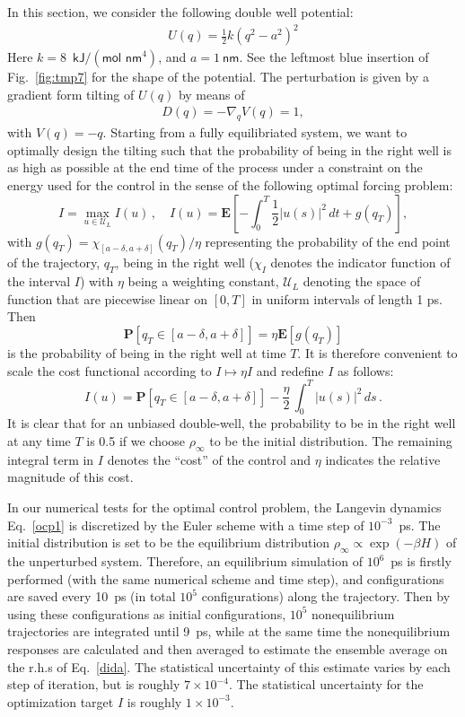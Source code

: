 \documentclass[]{tMPH2e}
\newcommand{\bE}{{\mathbf E}}
\newcommand{\bP}{{\mathbf P}}
\begin{document}
In this section, we consider the following double well potential:
\begin{align}
  U(q) = \frac12 k ( q^2 - a^2)^2
\end{align}
Here $k = 8$~$\textsf{kJ} / (\textsf{mol nm}^4)$, and $ a = 1\
\textsf{nm}$.  See the leftmost blue insertion of Fig.~\ref{fig:tmp7} for
the shape of the potential.
The perturbation is given by a gradient form tilting of $U( q)$ by means of
\begin{align}
   D( q) = -\nabla_{ q} V( q) = 1,
\end{align}
with $V( q) = - q$. {Starting from a fully equilibriated system},
we want to
optimally design the tilting such that the probability
of being in the right well is as high as possible 
at the end time of the process under a constraint on the energy used for the control in the sense of
the following optimal forcing problem:
\[
 I = \max_{u\in{\mathcal U}_{L}}I(u)\,,\quad I(u) = \bE\left[ -\int_{0}^{T} \frac{1}{2}|u(s)|^{2}\,dt + g(q_T) \right],
\]
with $g(q_T)=\chi_{[a-\delta,a+\delta]}(q_T)/\eta$ representing the probability of the end point of the trajectory, $ q_T$, being in the right well ($\chi_I$ denotes the indicator function of the interval $I$) with $\eta$ being a weighting constant, ${\mathcal U}_{L}$ denoting the space of function that are piecewise linear  on $[0, T]$ in uniform intervals of length 1 \textsf{ps}. Then
\[
\bP[q_{T}\in[a-\delta,a+\delta] ] = \eta \bE[g(q_T)]
\]
is the probability of being in the right well at time $T$. It is therefore convenient to scale the cost functional according to $I\mapsto\eta I$ and redefine $I$ as follows: 
\[
 I(u) = \bP[q_{T}\in[a-\delta,a+\delta] ] - \frac{\eta}{2}\,
   \int_0^T |u(s)|^2\, ds\,.
   \]
It is clear that for an unbiased double-well, the probability to be in the right well at any time $T$ is 0.5 if we choose $\rho_{\infty}$ to be the initial distribution. The remaining integral term in $I$ denotes the ``cost'' of the control and $\eta$  indicates the relative magnitude of this
cost. 

In our numerical tests for the optimal control problem, the
  Langevin dynamics Eq.~\eqref{ocp1} is discretized by the Euler
  scheme with a time step of $10^{-3}$~\textsf{ps}.
  The initial distribution is set to be the
  equilibrium distribution $\rho_\infty\propto\exp(-\beta H)$ of the unperturbed system.
  Therefore, an equilibrium simulation of $10^6$~\textsf{ps} is firstly performed (with
  the same numerical scheme and time step), and
  configurations are saved every 10~\textsf{ps} (in total $10^5$
  configurations) along the trajectory.
  Then by using these configurations as initial configurations,
  $10^5$ nonequilibrium
  trajectories are integrated until 9~\textsf{ps}, while at the same time
  the nonequilibrium responses are calculated and then averaged to
  estimate the ensemble average on the r.h.s of Eq.~\eqref{dida}.
  The statistical
  uncertainty of this estimate varies by each step of iteration, but
  is roughly $7\times10^{-4}$.  The statistical uncertainty for the 
  optimization target $I$ is roughly $1\times10^{-3}$.
\end{document}
